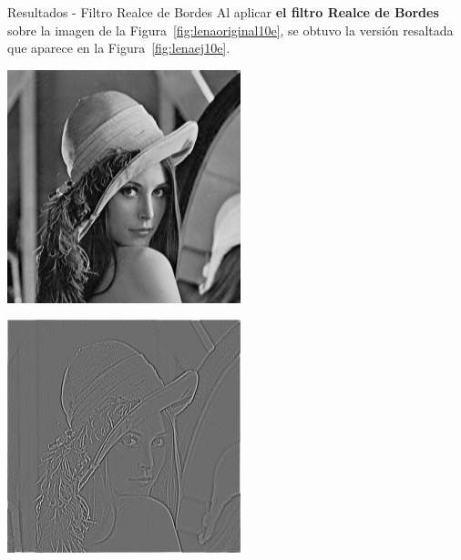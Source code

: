 \documentclass{beamer}
\begin{document}
\begin{frame}[fragile]{Resultados - Filtro Realce de Bordes}
	\justifying
	Al aplicar \textcolor{unahurverde}{\textbf{el filtro Realce de Bordes}} sobre la imagen de la Figura~\ref{fig:lenaoriginal10e},  
	se obtuvo la versión resaltada que aparece en la Figura~\ref{fig:lenaej10e}.
	
	\vspace{0.5cm}
	\centering
	\begin{minipage}{0.45\linewidth}
		\centering
		\includegraphics[width=\linewidth]{../results/lena_original}
		\label{fig:lenaoriginal10e}
	\end{minipage}\hfill
	\begin{minipage}{0.45\linewidth}
		\centering
		\includegraphics[width=\linewidth]{../results/lena_ej10e}

\end{minipage}
\end{frame}
\end{document}
